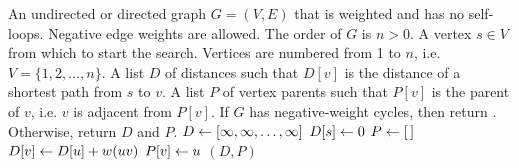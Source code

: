 
\begin{algorithmic}[1]
\Require An undirected or directed graph $G = (V, E)$ that is weighted
  and has no self-loops. Negative edge weights are allowed. The order
  of $G$ is $n > 0$. A vertex $s \in V$ from which to start the
  search. Vertices are numbered from 1 to $n$,
  i.e.~$V = \{1, 2, \dots, n\}$.
\Ensure A list $D$ of distances such that $D[v]$ is the distance of a
  shortest path from $s$ to $v$. A list $P$ of vertex parents such
  that $P[v]$ is the parent of $v$, i.e. $v$ is adjacent from
  $P[v]$. If $G$ has negative-weight cycles, then return
  \MyFalse. Otherwise, return $D$ and $P$.
\State $D \leftarrow [\infty, \infty, \dots, \infty]$\label{alg:Bellman_Ford:init_infinity}
\State $D[s] \leftarrow 0$
\State $P \leftarrow [\,]$\label{alg:Bellman_Ford:init_parent_list}
      \State $D[v] \leftarrow D[u] + w(uv)$
      \State $P[v] \leftarrow u$
    \EndIf
  \EndFor
  \label{alg:Bellman_Ford:for_loop:end_relax}
\EndFor
{}
    \State \Return \MyFalse
  \EndIf
\EndFor
\State \Return $(D, P)$
\end{algorithmic}
